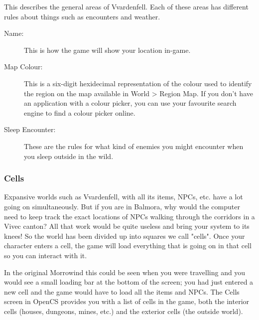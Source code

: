 This describes the general areas of Vvardenfell. Each of these areas has different rules about things such as encounters and weather.

\begin{description}
 \item[Name:] This is how the game will show your location in-game.
 \item[Map Colour:] This is a six-digit hexidecimal representation of the colour used to identify the region on the map available in World > Region Map. If you don't have an application with a colour picker, you can use your favourite search engine to find a colour picker online.
 \item[Sleep Encounter:] These are the rules for what kind of enemies you might encounter when you sleep outside in the wild.
\end{description}

\subsubsection{Cells}

Expansive worlds such as Vvardenfell, with all its items, NPCs, etc. have a lot going on simultaneously. But if you are in Balmora, why would the computer need to keep track the exact locations of NPCs walking through the corridors in a Vivec canton? All that work would be quite useless and bring your system to its knees! So the world has been divided up into squares we call "cells". Once your character enters a cell, the game will load everything that is going on in that cell so you can interact with it.

In the original Morrowind this could be seen when you were travelling and you would see a small loading bar at the bottom of the screen; you had just entered a new cell and the game would have to load all the items and NPCs. The Cells screen in OpenCS provides you with a list of cells in the game, both the interior cells (houses, dungeons, mines, etc.) and the exterior cells (the outside world).

